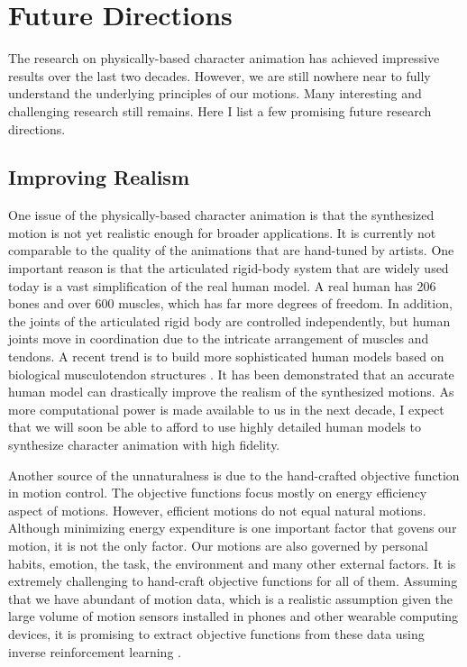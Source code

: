 \section{Future Directions}

The research on physically-based character animation has achieved impressive results over the last two decades. However, we are still nowhere near to fully understand the underlying principles of our motions. Many interesting and challenging research still remains. Here I list a few promising future research directions.

\subsection{Improving Realism}

One issue of the physically-based character animation is that the synthesized motion is not yet realistic enough for broader applications. It is currently not comparable to the quality of the animations that are hand-tuned by artists. One important reason is that the articulated rigid-body system that are widely used today is a vast simplification of the real human model. A real human has 206 bones and over 600 muscles, which has far more degrees of freedom. In addition, the joints of the articulated rigid body are controlled independently, but human joints move in coordination due to the intricate arrangement of muscles and tendons. A recent trend is to build more sophisticated human models based on biological musculotendon structures \cite{Lee:2006,Lee:2009:CBM,Wang:2012}. It has been demonstrated that an accurate human model can drastically improve the realism of the synthesized motions. As more computational power is made available to us in the next decade, I expect that we will soon be able to afford to use highly detailed human models to synthesize character animation with high fidelity.

Another source of the unnaturalness is due to the hand-crafted objective function in motion control. The objective functions focus mostly on energy efficiency aspect of motions. However, efficient motions do not equal natural motions. Although minimizing energy expenditure is one important factor that govens our motion, it is not the only factor. Our motions are also governed by personal habits, emotion, the task, the environment and many other external factors. It is extremely challenging to hand-craft objective functions for all of them. Assuming that we have abundant of motion data, which is a realistic assumption given the large volume of motion sensors installed in phones and other wearable computing devices, it is promising to extract objective functions from these data using inverse reinforcement learning \cite{Ng:2000}.


